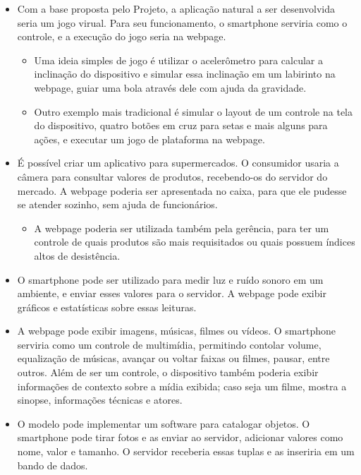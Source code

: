 \documentclass[a4paper,12pt]{article}
\begin{document}
\begin{itemize}
    \item Com a base proposta pelo Projeto, a aplicação natural a ser desenvolvida seria um jogo virual. Para seu funcionamento, o smartphone serviria como o controle, e a execução do jogo seria na webpage.

    \begin{itemize}
        \item Uma ideia simples de jogo é utilizar o acelerômetro para calcular a inclinação do dispositivo e simular essa inclinação em um labirinto na webpage, guiar uma bola através dele com ajuda da gravidade.

        \item Outro exemplo mais tradicional é simular o layout de um controle na tela do dispositivo, quatro botões em cruz para setas e mais alguns para ações, e executar um jogo de plataforma na webpage.
    \end{itemize}

    \item É possível criar um aplicativo para supermercados. O consumidor usaria a câmera para consultar valores de produtos, recebendo-os do servidor do mercado. A webpage poderia ser apresentada no caixa, para que ele pudesse se atender sozinho, sem ajuda de funcionários.

    \begin{itemize}
        \item A webpage poderia ser utilizada também pela gerência, para ter um controle de quais produtos são mais requisitados ou quais possuem índices altos de desistência.
    \end{itemize}

    \item O smartphone pode ser utilizado para medir luz e ruído sonoro em um ambiente, e enviar esses valores para o servidor. A webpage pode exibir gráficos e estatísticas sobre essas leituras.

    \item A webpage pode exibir imagens, músicas, filmes ou vídeos. O smartphone serviria como um controle de multimídia, permitindo contolar volume, equalização de músicas, avançar ou voltar faixas ou filmes, pausar, entre outros. Além de ser um controle, o dispositivo também poderia exibir informações de contexto sobre a mídia exibida; caso seja um filme, mostra a sinopse, informações técnicas e atores.

    \item O modelo pode implementar um software para catalogar objetos. O smartphone pode tirar fotos e as enviar ao servidor, adicionar valores como nome, valor e tamanho. O servidor receberia essas tuplas e as inseriria em um bando de dados.

\end{itemize}
\end{document}
